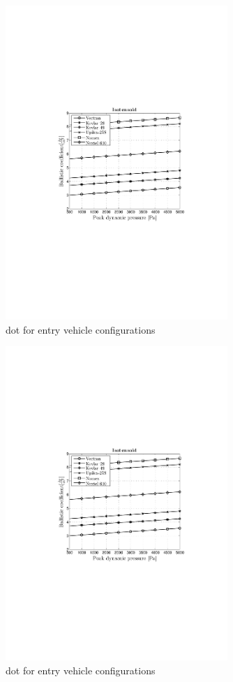 \begin{figure}[H]
\includegraphics[width = 0.75\textwidth]{Figure/ISO_mat.pdf}
\caption{\acrlong{dot} for entry vehicle configurations}
\label{fig:dotshape}
\end{figure}

\begin{figure}[H]
\includegraphics[width = 0.75\textwidth]{Figure/ISO_mat.pdf}
\caption{\acrlong{dot} for entry vehicle configurations}
\label{fig:dotshape}
\end{figure}

